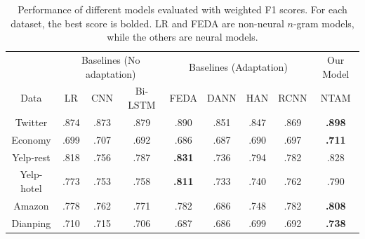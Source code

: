 
\begin{table}[t]
\centering
\begin{tabular}{c||ccc||cccc||c}
 & \multicolumn{3}{c||}{Baselines (No adaptation)} & \multicolumn{4}{c||}{Baselines (Adaptation)} & Our Model \\
Data & LR & CNN & Bi-LSTM & FEDA & DANN & HAN & RCNN & NTAM\\\hline\hline
Twitter & .874 & .873 & .879 & .890 & .851 & .847 & .869 & \textbf{.898} \\
Economy & .699 & .707 & .692 & .686 & .687 & .690 & .697 &  \textbf{.711} \\
Yelp-rest & .818 & .756 & .787 & \textbf{.831} & .736 & .794 & .782 & .828 \\
Yelp-hotel & .773 & .753 & .758 & \textbf{.811} & .733 & .740 & .762 & .790 \\
Amazon & .778 & .762 & .771 & .782 & .686 & .748 & .782 & \textbf{.808} \\
Dianping & .710 & .715 & .706 & .687 & .686 & .699 & .692 & \textbf{.738}
\end{tabular}
\caption{Performance of different models evaluated with weighted F1 scores. For each dataset, the best score is bolded. 
LR and FEDA are non-neural $n$-gram models, while the others are neural models.
}
\label{chap3:tab:results}
\end{table}


